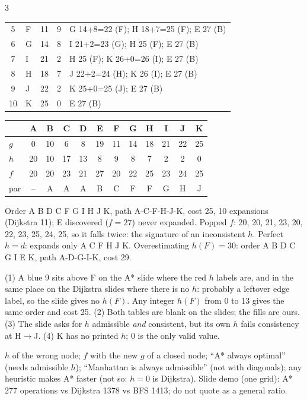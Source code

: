 \begin{multicols}{3}
\begin{worked}
\begin{tabularx}{\linewidth}{@{}clccX@{}}
5&F&11&9& G 14+8=22 (F); H 18+7=25 (F); E 27 (B)\\
6&G&14&8& I 21+2=23 (G); H 25 (F); E 27 (B)\\
7&I&21&2& H 25 (F); K 26+0=26 (I); E 27 (B)\\
8&H&18&7& J 22+2=24 (H); K 26 (I); E 27 (B)\\
9&J&22&2& K 25+0=25 (J); E 27 (B)\\
10&K&25&0& E 27 (B)\\\bottomrule
\end{tabularx}\par\vspace{2pt}
\begin{tabularx}{\linewidth}{@{}l*{11}{c}@{}}
 & A&B&C&D&E&F&G&H&I&J&K\\\midrule
$g$&0&10&6&8&19&11&14&18&21&22&25\\
$h$&20&10&17&13&8&9&8&7&2&2&0\\
$f$&20&20&23&21&27&20&22&25&23&24&25\\
par&--&A&A&A&B&C&F&F&G&H&J\\\bottomrule
\end{tabularx}\par\vspace{2pt}\normalsize
Order A B D C F G I H J K, path A-C-F-H-J-K, cost 25, 10 expansions (Dijkstra 11); E discovered ($f=27$) never expanded. Popped $f$: 20, 20, 21, 23, 20, 22, 23, 25, 24, 25, so it falls twice: the signature of an inconsistent $h$. Perfect $h=d$: expands only A C F H J K. Overestimating $h(F)=30$: order A B D C G I E K, path A-D-G-I-K, cost 29. \chk
\end{worked}
\begin{slideerr}[pp.\,56--60]
(1) A blue 9 sits above F on the A* slide where the red $h$ labels are, and in the same place on the Dijkstra slides where there is no $h$: probably a leftover edge label, so the slide gives no $h(F)$. Any integer $h(F)$ from 0 to 13 gives the same order and cost 25. (2) Both tables are blank on the slides; the fills are ours. (3) The slide asks for $h$ admissible \emph{and} consistent, but its own $h$ fails consistency at H$\to$J. (4) K has no printed $h$; 0 is the only valid value.
\end{slideerr}
\begin{trap}
$h$ of the wrong node; $f$ with the new $g$ of a closed node; ``A* always optimal'' (needs admissible $h$); ``Manhattan is always admissible'' (not with diagonals); any heuristic makes A* faster (not so: $h=0$ is Dijkstra). Slide demo (one grid): A* 277 operations vs Dijkstra 1378 vs BFS 1413; do not quote as a general ratio.
\end{trap}


\end{multicols}
